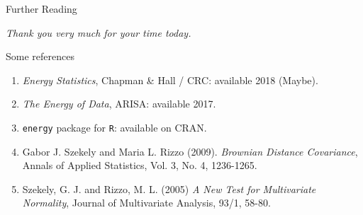 \documentclass[presentation]{beamer}
\begin{document}
\begin{frame}{Further Reading}
  \begin{center}
    \textit{Thank you very much for your time today.}
  \end{center}

  \begin{block}{Some references}
    \begin{enumerate}
    \item \textit{Energy Statistics}, Chapman \&  Hall / CRC:
      available 2018 (Maybe).
    \item \textit{The Energy of Data}, ARISA: available 2017.
    \item \texttt{energy} package for \texttt{R}: available on CRAN.
    \item Gabor J. Szekely and Maria L. Rizzo (2009). \textit{Brownian Distance Covariance},
      Annals of Applied Statistics, Vol. 3, No. 4, 1236-1265. 
    \item Szekely, G. J. and Rizzo, M. L. (2005) \textit{A New Test for Multivariate Normality},
      Journal of Multivariate Analysis, 93/1, 58-80.
    \end{enumerate}
  \end{block}
\end{frame}
\end{document}
